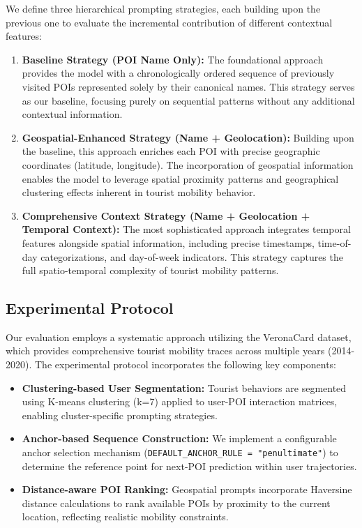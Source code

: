 \documentclass[12pt,a4paper]{article}
\begin{document}
We define three hierarchical prompting strategies, each building upon the previous one to evaluate the incremental contribution of different contextual features:

\begin{enumerate}
\item \textbf{Baseline Strategy (POI Name Only):} The foundational approach provides the model with a chronologically ordered sequence of previously visited POIs represented solely by their canonical names. This strategy serves as our baseline, focusing purely on sequential patterns without any additional contextual information.

\item \textbf{Geospatial-Enhanced Strategy (Name + Geolocation):} Building upon the baseline, this approach enriches each POI with precise geographic coordinates (latitude, longitude). The incorporation of geospatial information enables the model to leverage spatial proximity patterns and geographical clustering effects inherent in tourist mobility behavior.

\item \textbf{Comprehensive Context Strategy (Name + Geolocation + Temporal Context):} The most sophisticated approach integrates temporal features alongside spatial information, including precise timestamps, time-of-day categorizations, and day-of-week indicators. This strategy captures the full spatio-temporal complexity of tourist mobility patterns.
\end{enumerate}

\subsection{Experimental Protocol}

Our evaluation employs a systematic approach utilizing the VeronaCard dataset, which provides comprehensive tourist mobility traces across multiple years (2014-2020). The experimental protocol incorporates the following key components:

\begin{itemize}
\item \textbf{Clustering-based User Segmentation:} Tourist behaviors are segmented using K-means clustering (k=7) applied to user-POI interaction matrices, enabling cluster-specific prompting strategies.
\item \textbf{Anchor-based Sequence Construction:} We implement a configurable anchor selection mechanism (\texttt{DEFAULT\_ANCHOR\_RULE = "penultimate"}) to determine the reference point for next-POI prediction within user trajectories.
\item \textbf{Distance-aware POI Ranking:} Geospatial prompts incorporate Haversine distance calculations to rank available POIs by proximity to the current location, reflecting realistic mobility constraints.
\end{itemize}
\end{document}
